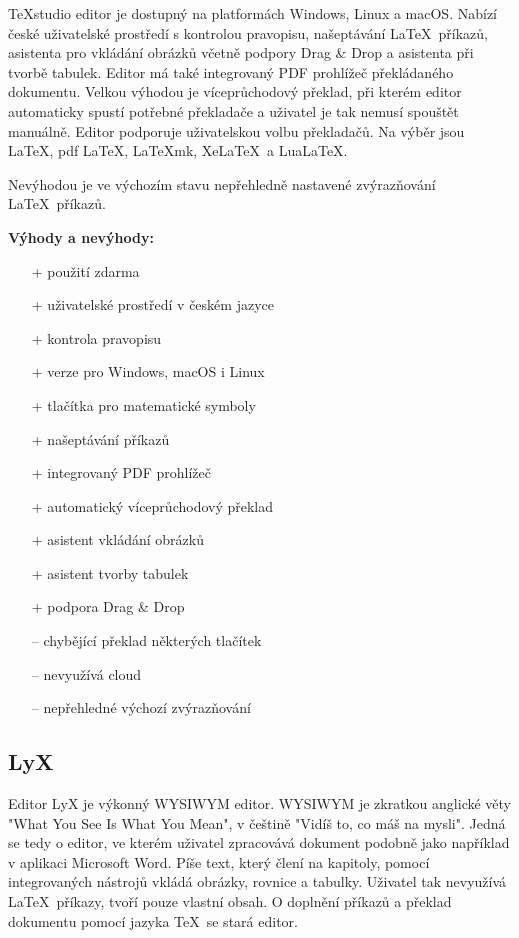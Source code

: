 \TeX studio editor je dostupný na platformách Windows, Linux a macOS. Nabízí české uživatelské prostředí s kontrolou pravopisu, našeptávání \LaTeX\ příkazů, asistenta pro vkládání obrázků včetně podpory Drag \& Drop a asistenta při tvorbě tabulek. Editor má také integrovaný PDF prohlížeč překládaného dokumentu. Velkou výhodou je víceprůchodový překlad, při kterém editor automaticky spustí potřebné překladače a uživatel je tak nemusí spouštět manuálně. Editor podporuje uživatelskou volbu překladačů. Na výběr jsou \LaTeX, pdf \LaTeX, \LaTeX mk, Xe\LaTeX\ a Lua\LaTeX. \cite{Texstudiofeatures}

Nevýhodou je ve výchozím stavu nepřehledně nastavené zvýrazňování \LaTeX\ příkazů.

\textbf{Výhody a nevýhody:}
\begin{multicols}{2}
	\begin{itemize}
		\item [+] použití zdarma
		\item [+] uživatelské prostředí v českém jazyce
		\item [+] kontrola pravopisu
		\item [+] verze pro Windows, macOS i Linux
		\item [+] tlačítka pro matematické symboly
		\item [+] našeptávání příkazů
		\item [+] integrovaný PDF prohlížeč
		\item [+] automatický víceprůchodový překlad
		\item [+] asistent vkládání obrázků
		\item [+] asistent tvorby tabulek
		\item [+] podpora Drag \& Drop
	\columnbreak
		\item [--] chybějící překlad některých tlačítek
		\item [--] nevyužívá cloud
		\item [--] nepřehledné výchozí zvýrazňování
	\end{itemize}
\end{multicols}

\subsection{LyX}
Editor LyX je výkonný WYSIWYM editor. WYSIWYM je zkratkou anglické věty "What You See Is What You Mean", v češtině "Vidíš to, co máš na mysli". Jedná se tedy o editor, ve kterém uživatel zpracovává dokument podobně jako například v aplikaci Microsoft Word. Píše text, který člení na kapitoly, pomocí integrovaných nástrojů vkládá obrázky, rovnice a tabulky. Uživatel tak nevyužívá \LaTeX\ příkazy, tvoří pouze vlastní obsah. O doplnění příkazů a překlad dokumentu pomocí jazyka \TeX\ se stará editor. \cite{Lyx}


